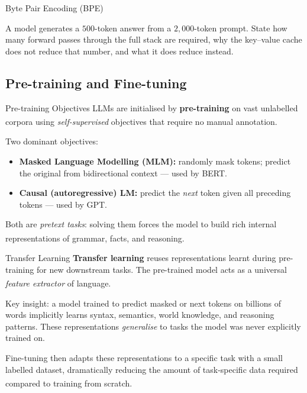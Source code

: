 \begin{v3topic}{Byte Pair Encoding (BPE)}
\begin{checkpoint}
A model generates a $500$-token answer from a $2{,}000$-token prompt. State how
many forward passes through the full stack are required, why the key--value
cache does not reduce that number, and what it does reduce instead.
\end{checkpoint}

\subsection{Pre-training and Fine-tuning}


\begin{v3topic}{Pre-training Objectives}
    LLMs are initialised by \textbf{pre-training} on vast unlabelled corpora using
    \emph{self-supervised} objectives that require no manual
    annotation.\textsuperscript{\cite[][p.~9]{dhamaniIntroductionGenerativeAI2024}}

    Two dominant objectives:
    \begin{itemize}
        \item \textbf{Masked Language Modelling (MLM):} randomly mask tokens; predict
              the original from bidirectional context --- used by BERT.
        \item \textbf{Causal (autoregressive) LM:} predict the \emph{next} token given
              all preceding tokens --- used by GPT.
    \end{itemize}

    Both are \emph{pretext tasks}: solving them forces the model to build rich internal
    representations of grammar, facts, and
    reasoning.\textsuperscript{\cite[][p.~5]{raschkaBuildLargeLanguage2025}}

\end{v3topic}
\begin{v3topic}{Transfer Learning}
    \textbf{Transfer learning} reuses representations learnt during pre-training for new
    downstream tasks. The pre-trained model acts as a universal \emph{feature extractor}
    of language.\textsuperscript{\cite[][p.~9]{dhamaniIntroductionGenerativeAI2024}}

    Key insight: a model trained to predict masked or next tokens on billions of words
    implicitly learns syntax, semantics, world knowledge, and reasoning patterns. These
    representations \emph{generalise} to tasks the model was never explicitly trained on.

    Fine-tuning then adapts these representations to a specific task with a small labelled
    dataset, dramatically reducing the amount of task-specific data required compared to
    training from
    scratch.\textsuperscript{\cite[][p.~70]{farrisHowLargeLanguage2025}}


\end{v3topic}
\end{v3topic}
